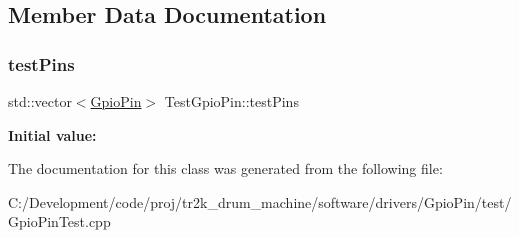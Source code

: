 \subsection{Member Data Documentation}
\mbox{\label{class_test_gpio_pin_a9f11ed851f5dc2f0a9d73a8176c58560}} 
\subsubsection{\texorpdfstring{testPins}{testPins}}
{\footnotesize\ttfamily std\+::vector$<$\mbox{\hyperlink{class_gpio_pin}{Gpio\+Pin}}$>$ Test\+Gpio\+Pin\+::test\+Pins}

{\bfseries Initial value\+:}
\begin{DoxyCode}{0}

\end{DoxyCode}


The documentation for this class was generated from the following file\+:\begin{DoxyCompactItemize}
\item 
C\+:/\+Development/code/proj/tr2k\+\_\+drum\+\_\+machine/software/drivers/\+Gpio\+Pin/test/Gpio\+Pin\+Test.\+cpp\end{DoxyCompactItemize}
